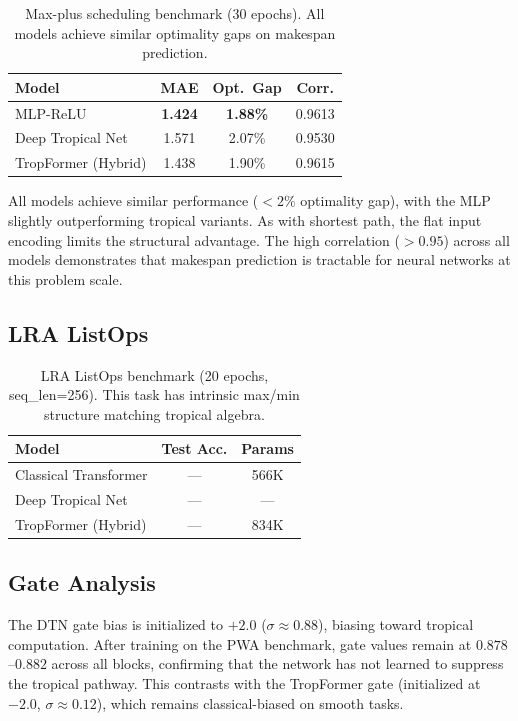 \documentclass[11pt,twocolumn]{article}
\begin{document}
\begin{table}[t]
\centering
\caption{Max-plus scheduling benchmark (30 epochs). All models achieve
  similar optimality gaps on makespan prediction.}
\label{tab:scheduling}
\begin{tabular}{lccc}
\toprule
\textbf{Model} & \textbf{MAE} & \textbf{Opt.\ Gap} & \textbf{Corr.} \\
\midrule
MLP-ReLU              & \textbf{1.424} & \textbf{1.88\%} & 0.9613 \\
Deep Tropical Net     & 1.571 & 2.07\% & 0.9530 \\
TropFormer (Hybrid)   & 1.438 & 1.90\% & 0.9615 \\
\bottomrule
\end{tabular}
\end{table}

All models achieve similar performance ($<2\%$ optimality gap), with the
MLP slightly outperforming tropical variants. As with shortest path, the
flat input encoding limits the structural advantage. The high correlation
($>0.95$) across all models demonstrates that makespan prediction is
tractable for neural networks at this problem scale.

\subsection{LRA ListOps}

\begin{table}[t]
\centering
\caption{LRA ListOps benchmark (20 epochs, seq\_len=256). This task
  has intrinsic max/min structure matching tropical algebra.}
\label{tab:listops}
\begin{tabular}{lcc}
\toprule
\textbf{Model} & \textbf{Test Acc.} & \textbf{Params} \\
\midrule
Classical Transformer & --- & 566K \\
Deep Tropical Net     & --- & --- \\
TropFormer (Hybrid)   & --- & 834K \\
\bottomrule
\end{tabular}
\end{table}

\subsection{Gate Analysis}

The DTN gate bias is initialized to $+2.0$ ($\sigma \approx 0.88$), biasing
toward tropical computation. After training on the PWA benchmark, gate
values remain at $0.878$--$0.882$ across all blocks, confirming that the
network has not learned to suppress the tropical pathway. This contrasts
with the TropFormer gate (initialized at $-2.0$, $\sigma \approx 0.12$),
which remains classical-biased on smooth tasks.
\end{document}

